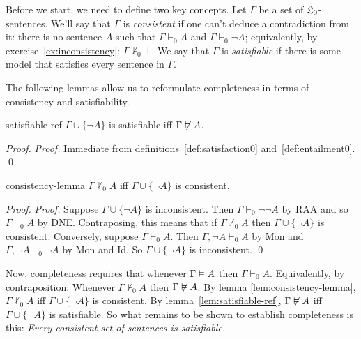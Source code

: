 Before we start, we need to define two key concepts.
Let $\Gamma$ be a set of $\mathfrak{L}_0$-sentences.
We'll say that $\Gamma$ is \emph{consistent} if
one can't deduce a contradiction from it:
there is no sentence $A$ such that
$\Gamma \vdash_{0} A$ and $\Gamma \vdash_{0} \neg A$;
equivalently,
by exercise~\ref{ex:inconsistency}:
$\Gamma \not\vdash_{0} \bot$.
We say that $\Gamma$ is \emph{satisfiable} if
there is some model that satisfies every sentence in $\Gamma$.


The following lemmas allow us to reformulate completeness in terms of
consistency and satisfiability.

\begin{lemma}{}{satisfiable-ref}
  $\Gamma \cup \{\neg A\}$ is satisfiable iff $\Gamma \not\vDash A$.
\end{lemma}
\begin{proof}
  \emph{Proof.}
  Immediate from definitions~\ref{def:satisfaction0} and~\ref{def:entailment0}. \qed
\end{proof}

\begin{lemma}{}{consistency-lemma}
  $\Gamma \not\vdash_{0} A$ iff $\Gamma \cup \{\neg A\}$ is consistent.
\end{lemma}
\begin{proof}
  \emph{Proof.}
  Suppose $\Gamma \cup \{\neg A\}$ is inconsistent.
  Then $\Gamma \vdash_0 \neg \neg A$ by RAA
  and so $\Gamma \vdash_0 A$ by DNE.
  Contraposing,
  this means that if $\Gamma \not\vdash_{0} A$ then $\Gamma \cup \{ \neg A \}$ is consistent.
  Conversely,
  suppose $\Gamma \vdash_{0} A$.
  Then $\Gamma, \neg A \vdash_{0} A$ by Mon
  and $\Gamma, \neg A \vdash_{0} \neg A$ by Mon and Id.
  So $\Gamma \cup \{ \neg A \}$ is inconsistent. \qed
\end{proof}


Now,
completeness requires that
whenever $\Gamma \vDash A$ then $\Gamma \vdash_{0} A$.
Equivalently, by contraposition:
Whenever $\Gamma \not\vdash_{0} A$ then $\Gamma \not\vDash A$.
By lemma \ref{lem:consistency-lemma},
$\Gamma \not\vdash_{0} A$ iff $\Gamma \cup \{\neg A\}$ is consistent.
By lemma~\ref{lem:satisfiable-ref},
$\Gamma \not\vDash A$ iff $\Gamma \cup \{\neg A\}$ is satisfiable.
So what remains to be shown to establish completeness is this:
\emph{Every consistent set of sentences is satisfiable.}

